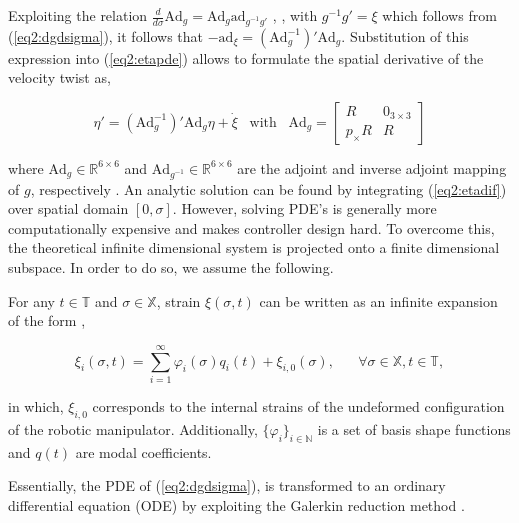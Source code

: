 Exploiting the relation $\frac{d}{d \sigma} \text{Ad}_g = \text{Ad}_g \text{ad}_{g^{-1}g'}$ \cite{Boyer2019}, \cite{traversaro2016multibody} , with $g^{-1}g' = \xi$ which follows from (\ref{eq2:dgdsigma}), it follows that $-\text{ad}_\xi = (\text{Ad}_g^{-1})'\text{Ad}_g$. Substitution of this expression into (\ref{eq2:etapde}) allows to formulate the spatial derivative of the velocity twist as,

\begin{equation}
    \eta'= (\text{Ad}_g^{-1})'\text{Ad}_g \eta + \Dot{\xi} \hspace{10pt} \text{with} \hspace{10pt} \text{Ad}_g = \begin{bmatrix} R & 0_{3\times 3} \\ p_\times R & R \end{bmatrix}
    \label{eq2:etadif}
\end{equation}

where $\text{Ad}_g \in \mathbb{R}^{6 \times 6}$ and $\text{Ad}_{g^{-1}}  \in \mathbb{R}^{6 \times 6}$ are the adjoint and inverse adjoint mapping of $g$, respectively \cite{Sola2018}. An analytic solution can be found by integrating (\ref{eq2:etadif}) over spatial domain $[0,\sigma]$. However, solving PDE's is generally more computationally expensive and makes controller design hard.
To overcome this, the theoretical infinite dimensional system is projected onto a finite dimensional subspace. In order to do so, we assume the following.


\begin{theorem}

For any $t \in \mathbb{T}$ and $\sigma \in \mathbb{X}$, strain $\xi(\sigma,t)$ can be written as an infinite expansion of the form \cite{Caasenbrood2021},

\begin{equation}
\xi_i(\sigma,t) = \sum_{i=1}^\infty \varphi_i(\sigma)q_i(t) + \xi_{i,0}(\sigma), \hspace{20pt} \forall \sigma \in \mathbb{X}, t \in \mathbb{T},
\label{eq2:strainexact}
\end{equation}

in which, $\xi_{i,0}$ corresponds to the internal strains of the undeformed configuration of the robotic manipulator. Additionally, $\{\varphi_i\}_{i \in \mathbb{N}}$ is a set of basis shape functions and $q(t)$ are modal coefficients. 
\end{theorem}

Essentially, the PDE of (\ref{eq2:dgdsigma}), is transformed to an ordinary differential equation (ODE) by exploiting the Galerkin reduction method \cite{Galerkin}.



